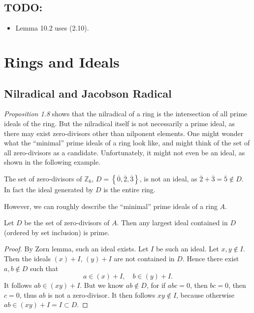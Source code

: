 \documentclass{note}
\begin{document}
\section*{TODO:}

\begin{itemize}
  \item Lemma 10.2 uses (2.10).
\end{itemize}

\chapter{Rings and Ideals}

\section*{Nilradical and Jacobson Radical}
\textit{Proposition 1.8} shows that the nilradical of a ring is the
intersection of all prime ideals of the ring. But the nilradical itself is not
necessarily a prime ideal, as there may exist zero-divisors other than
nilponent elements. One might wonder what the ``minimal'' prime ideals of a
ring look like, and might think of the set of all zero-divisors as a candidate.
Unfortunately, it might not even be an ideal, as shown in the following
example.
\begin{example*}
  The set of zero-divisors of $\mathbb{Z}_6$, $D =
    \left\{\overline{0},\overline{2},\overline{3}\right\}$, is not an ideal, as
  $\overline{2}+\overline{3}=\overline{5} \notin D$. In fact the ideal generated
  by $D$ is the entire ring.
\end{example*}
However, we can roughly describe the ``minimal'' prime ideals of a ring $A$.
\begin{proposition*}
  Let $D$ be the set of zero-divisors of $A$. Then any largest ideal contained in
  $D$ (ordered by set inclusion) is prime.
\end{proposition*}
\begin{proof}
  By Zorn lemma, such an ideal exists. Let $I$ be such an ideal. Let $x,y\notin
    I$. Then the ideals $(x)+I$, $(y)+I$ are not contained in $D$. Hence there
  exist $a,b\notin D$ such that $$a\in (x)+I, \quad b\in(y)+I.$$ It follows
  $ab\in (xy) + I$. But we know $ab\notin D$, for if $abc=0$, then $bc=0$, then
  $c=0$, thus $ab$ is not a zero-divisor. It then follows $xy\notin I$, because
  otherwise $ab\in (xy) + I = I \subset D$.
\end{proof}
\end{document}
